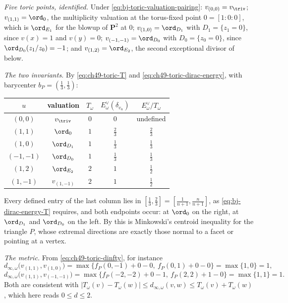 \begin{example}
\emph{Five toric points, identified.}  Under
\eqref{eq:bj-toric-valuation-pairing}:
$v_{(0,0)}=v_{\triv}$;
$v_{(1,1)}=\ord_0$, the multiplicity valuation at the torus-fixed point
$0=[1:0:0]$, which is $\ord_{E_1}$ for the blowup of $\mathbf P^2$
at $0$;
$v_{(1,0)}=\ord_{D_1}$ with $D_1=\{z_1=0\}$, since
$v(x)=1$ and $v(y)=0$;
$v_{(-1,-1)}=\ord_{D_0}$ with $D_0=\{z_0=0\}$, since
$\ord_{D_0}(z_1/z_0)=-1$;
and $v_{(1,2)}=\ord_{E_2}$, the second exceptional divisor of
 below.

\emph{The two invariants.}  By \eqref{eq:ch49-toric-T} and
\eqref{eq:ch49-toric-dirac-energy}, with barycenter
$b_P=(\tfrac13,\tfrac13)$:
\begin{center}
\begin{tabular}{ccccc}
\toprule
$u$ & valuation & $T_\omega$ & $E^\vee_\omega(\delta_{v_u})$
& $E^\vee_\omega/T_\omega$\\
\midrule
$(0,0)$ & $v_{\triv}$ & $0$ & $0$ & undefined\\
$(1,1)$ & $\ord_0$ & $1$ & $\tfrac23$ & $\tfrac23$\\
$(1,0)$ & $\ord_{D_1}$ & $1$ & $\tfrac13$ & $\tfrac13$\\
$(-1,-1)$ & $\ord_{D_0}$ & $1$ & $\tfrac13$ & $\tfrac13$\\
$(1,2)$ & $\ord_{E_2}$ & $2$ & $1$ & $\tfrac12$\\
$(1,-1)$ & $v_{(1,-1)}$ & $2$ & $1$ & $\tfrac12$\\
\bottomrule
\end{tabular}
\end{center}
Every defined entry of the last column lies in
$[\tfrac13,\tfrac23]=[\tfrac1{n+1},\tfrac n{n+1}]$, as
\eqref{eq:bj-dirac-energy-T} requires, and both endpoints occur: at
$\ord_0$ on the right, at $\ord_{D_1}$ and $\ord_{D_0}$ on the left.
By  this is Minkowski's centroid inequality for
the triangle $P$, whose extremal directions are exactly those normal to
a facet or pointing at a vertex.

\emph{The metric.}  From \eqref{eq:ch49-toric-dinfty}, for instance
\[
 d_{\infty,\omega}\bigl(v_{(1,1)},v_{(1,0)}\bigr)
 =\max\{f_P(0,-1)+0-0,\ f_P(0,1)+0-0\}=\max\{1,0\}=1,
\]
\[
 d_{\infty,\omega}\bigl(v_{(1,1)},v_{(-1,-1)}\bigr)
 =\max\{f_P(-2,-2)+0-1,\ f_P(2,2)+1-0\}=\max\{1,1\}=1 .
\]
Both are consistent with
$|T_\omega(v)-T_\omega(w)|\le d_{\infty,\omega}(v,w)\le
T_\omega(v)+T_\omega(w)$, which here reads $0\le d\le2$.


\end{example}
